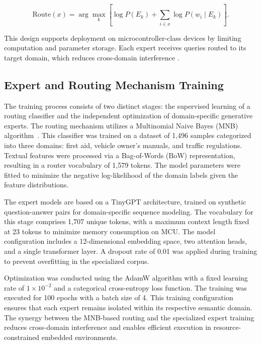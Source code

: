 \documentclass[conference]{IEEEtran}
\begin{document}
\begin{equation}
\text{Route}(x) = \arg\max_{k} \left[ \log P(E_k) + \sum_{i \in x} \log P(w_i \mid E_k) \right].
\end{equation}

This design supports deployment on microcontroller-class devices by limiting computation and parameter storage. Each expert receives queries routed to its target domain, which reduces cross-domain interference \cite{puigcerver2024sparse}.




\subsection{Expert and Routing Mechanism Training}
The training process consists of two distinct stages: the supervised learning of a routing classifier and the independent optimization of domain-specific generative experts. The routing mechanism utilizes a Multinomial Naive Bayes (MNB) algorithm~\cite{10.1007/978-981-10-5041-1_57}. This classifier was trained on a dataset of 1,496 samples categorized into three domains: first aid, vehicle owner's manuals, and traffic regulations. Textual features were processed via a Bag-of-Words (BoW) representation, resulting in a router vocabulary of 1,579 tokens. The model parameters were fitted to minimize the negative log-likelihood of the domain labels given the feature distributions.

The expert models are based on a TinyGPT architecture, trained on synthetic question-answer pairs for domain-specific sequence modeling. The vocabulary for this stage comprises 1,707 unique tokens, with a maximum context length fixed at 23 tokens to minimize memory consumption on MCU. The model configuration includes a 12-dimensional embedding space, two attention heads, and a single transformer layer. A dropout rate of 0.01 was applied during training to prevent overfitting in the specialized corpus.

Optimization was conducted using the AdamW algorithm with a fixed learning rate of $1 \times 10^{-2}$ and a categorical cross-entropy loss function. The training was executed for 100 epochs with a batch size of 4. This training configuration ensures that each expert remains isolated within its respective semantic domain. The synergy between the MNB-based routing and the specialized expert training reduces cross-domain interference and enables efficient execution in resource-constrained embedded environments.
\end{document}
